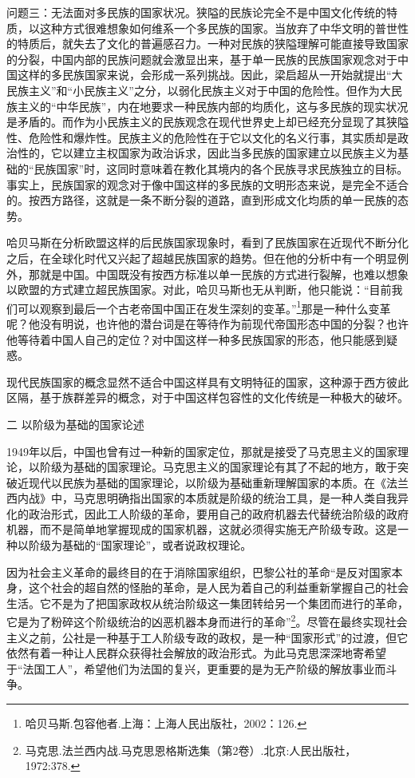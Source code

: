 \documentclass[UTF8, 12pt, a4paper]{ctexrep}
\begin{document}
问题三：无法面对多民族的国家状况。狭隘的民族论完全不是中国文化传统的特质，以这种方式很难想象如何维系一个多民族的国家。当放弃了中华文明的普世性的特质后，就失去了文化的普遍感召力。一种对民族的狭隘理解可能直接导致国家的分裂，中国内部的民族问题就会激显出来，基于单一民族的民族国家观念对于中国这样的多民族国家来说，会形成一系列挑战。因此，梁启超从一开始就提出“大民族主义”和“小民族主义”之分，以弱化民族主义对于中国的危险性。但作为大民族主义的“中华民族”，内在地要求一种民族内部的均质化，这与多民族的现实状况是矛盾的。而作为小民族主义的民族观念在现代世界史上却已经充分显现了其狭隘性、危险性和爆炸性。民族主义的危险性在于它以文化的名义行事，其实质却是政治性的，它以建立主权国家为政治诉求，因此当多民族的国家建立以民族主义为基础的“民族国家”时，这同时意味着在教化其境内的各个民族寻求民族独立的目标。事实上，民族国家的观念对于像中国这样的多民族的文明形态来说，是完全不适合的。按西方路径，这就是一条不断分裂的道路，直到形成文化均质的单一民族的态势。

哈贝马斯在分析欧盟这样的后民族国家现象时，看到了民族国家在近现代不断分化之后，在全球化时代又兴起了超越民族国家的趋势。但在他的分析中有一个明显例外，那就是中国。中国既没有按西方标准以单一民族的方式进行裂解，也难以想象以欧盟的方式建立超民族国家。对此，哈贝马斯也无从判断，他只能说：“目前我们可以观察到最后一个古老帝国中国正在发生深刻的变革。”\footnote{哈贝马斯.包容他者.上海：上海人民出版社，2002：126.}那是一种什么变革呢？他没有明说，也许他的潜台词是在等待作为前现代帝国形态中国的分裂？也许他等待着中国人自己的定位？对中国这样一种多民族国家的形态，他只能感到疑惑。

现代民族国家的概念显然不适合中国这样具有文明特征的国家，这种源于西方彼此区隔，基于族群差异的概念，对于中国这样包容性的文化传统是一种极大的破坏。

二 以阶级为基础的国家论述

1949年以后，中国也曾有过一种新的国家定位，那就是接受了马克思主义的国家理论，以阶级为基础的国家理论。马克思主义的国家理论有其了不起的地方，敢于突破近现代以民族为基础的国家理论，以阶级为基础重新理解国家的本质。在《法兰西内战》中，马克思明确指出国家的本质就是阶级的统治工具，是一种人类自我异化的政治形式，因此工人阶级的革命，要用自己的政府机器去代替统治阶级的政府机器，而不是简单地掌握现成的国家机器，这就必须得实施无产阶级专政。这是一种以阶级为基础的“国家理论”，或者说政权理论。

因为社会主义革命的最终目的在于消除国家组织，巴黎公社的革命“是反对国家本身，这个社会的超自然的怪胎的革命，是人民为着自己的利益重新掌握自己的社会生活。它不是为了把国家政权从统治阶级这一集团转给另一个集团而进行的革命，它是为了粉碎这个阶级统治的凶恶机器本身而进行的革命”\footnote{马克思.法兰西内战.马克思恩格斯选集（第2卷）.北京:人民出版社，1972:378.}。尽管在最终实现社会主义之前，公社是一种基于工人阶级专政的政权，是一种“国家形式”的过渡，但它依然有着一种让人民群众获得社会解放的政治形式。为此马克思深深地寄希望于“法国工人”，希望他们为法国的复兴，更重要的是为无产阶级的解放事业而斗争。
\end{document}
